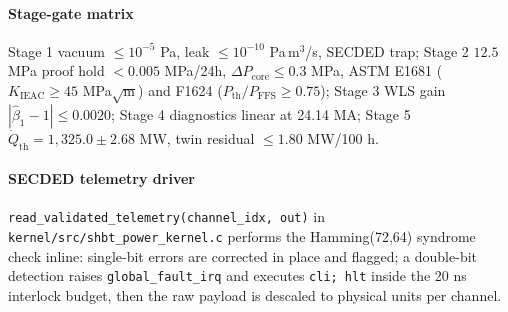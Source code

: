 \documentclass[10pt,journal,compsoc]{IEEEtran}
\begin{document}
\paragraph{Stage-gate matrix}
Stage 1 vacuum $\le 10^{-5}$ Pa, leak $\le 10^{-10}$
Pa\,m$^3$/s, SECDED trap; Stage 2 $12.5$ MPa proof hold
$<0.005$ MPa/24h, $\Delta P_{\mathrm{core}} \le 0.3$ MPa, ASTM E1681
($K_{\mathrm{IEAC}} \ge 45$ MPa$\sqrt{\mathrm{m}}$) and F1624
($P_{\mathrm{th}}/P_{\mathrm{FFS}} \ge 0.75$); Stage 3 WLS gain
$|\hat{\beta}_1 - 1| \le 0.0020$; Stage 4 diagnostics linear at
24.14 MA; Stage 5 $\dot{Q}_{\mathrm{th}} = 1{,}325.0 \pm 2.68$ MW,
twin residual $\le 1.80$ MW/100 h.

\paragraph{SECDED telemetry driver}
\texttt{read\_validated\_telemetry(channel\_idx, out)} in
\texttt{kernel/src/shbt\_power\_kernel.c} performs the Hamming(72,64)
syndrome check inline: single-bit errors are corrected in place and
flagged; a double-bit detection raises \texttt{global\_fault\_irq}
and executes \texttt{cli; hlt} inside the 20 ns interlock budget, then
the raw payload is descaled to physical units per channel.








\begin{sloppypar}

\end{sloppypar}
\end{document}
